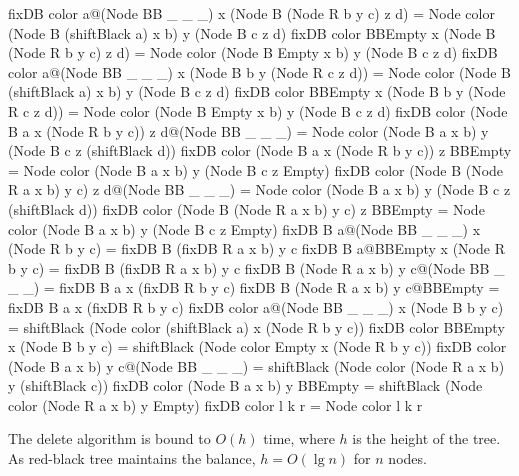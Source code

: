 \documentclass[b5paper]{article}
\begin{document}
\begin{Haskell}
fixDB color a@(Node BB _ _ _) x (Node B (Node R b y c) z d)
      = Node color (Node B (shiftBlack a) x b) y (Node B c z d)
fixDB color BBEmpty x (Node B (Node R b y c) z d)
      = Node color (Node B Empty x b) y (Node B c z d)
fixDB color a@(Node BB _ _ _) x (Node B b y (Node R c z d))
      = Node color (Node B (shiftBlack a) x b) y (Node B c z d)
fixDB color BBEmpty x (Node B b y (Node R c z d))
      = Node color (Node B Empty x b) y (Node B c z d)
fixDB color (Node B a x (Node R b y c)) z d@(Node BB _ _ _)
      = Node color (Node B a x b) y (Node B c z (shiftBlack d))
fixDB color (Node B a x (Node R b y c)) z BBEmpty
      = Node color (Node B a x b) y (Node B c z Empty)
fixDB color (Node B (Node R a x b) y c) z d@(Node BB _ _ _)
      = Node color (Node B a x b) y (Node B c z (shiftBlack d))
fixDB color (Node B (Node R a x b) y c) z BBEmpty
      = Node color (Node B a x b) y (Node B c z Empty)
fixDB B a@(Node BB _ _ _) x (Node R b y c)
      = fixDB B (fixDB R a x b) y c
fixDB B a@BBEmpty x (Node R b y c)
      = fixDB B (fixDB R a x b) y c
fixDB B (Node R a x b) y c@(Node BB _ _ _)
      = fixDB B a x (fixDB R b y c)
fixDB B (Node R a x b) y c@BBEmpty
      = fixDB B a x (fixDB R b y c)
fixDB color a@(Node BB _ _ _) x (Node B b y c)
      = shiftBlack (Node color (shiftBlack a) x (Node R b y c))
fixDB color BBEmpty x (Node B b y c)
      = shiftBlack (Node color Empty x (Node R b y c))
fixDB color (Node B a x b) y c@(Node BB _ _ _)
      = shiftBlack (Node color (Node R a x b) y (shiftBlack c))
fixDB color (Node B a x b) y BBEmpty
      = shiftBlack (Node color (Node R a x b) y Empty)
fixDB color l k r = Node color l k r
\end{Haskell}

The delete algorithm is bound to $O(h)$ time, where $h$ is the height of the tree. As red-black tree maintains the balance, $h = O(\lg n)$ for $n$ nodes.

\begin{Exercise}\label{ex:mark-rebuild}
\end{Exercise}
\end{document}
